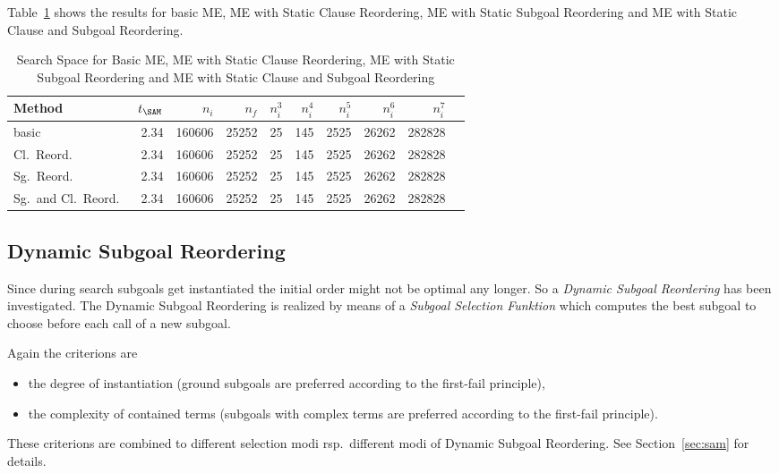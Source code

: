 Table~\ref{tab:tut2:results.static-reord} shows the results for basic
ME, ME with Static Clause Reordering, ME with Static Subgoal
Reordering and ME with Static Clause and Subgoal Reordering.

\begin{table}[htb]
\begin{center}
\begin{tabular}{|l|r|r||r|r||r|r|r|r|r|}
\hline
Method & $t_{\SAM}$ & $n_i$ & $n_f$ & 
	$n_i^3$ & $n_i^4$ & $n_i^5$ & $n_i^6$ & $n_i^7$ \\
\hline\hline
basic & 2.34 & 160606 & 25252 &
	25 & 145 & 2525 & 26262 & 282828 \\
\hline
Cl.\ Reord.\ & 2.34 & 160606 & 25252 &
	25 & 145 & 2525 & 26262 & 282828 \\
\hline
Sg.\ Reord.\ & 2.34 & 160606 & 25252 &
	25 & 145 & 2525 & 26262 & 282828 \\
\hline
Sg.\ and Cl.\ Reord.\ & 2.34 & 160606 & 25252 &
	25 & 145 & 2525 & 26262 & 282828 \\
\hline\hline
\end{tabular}
\end{center}
\caption{Search Space for Basic ME, ME with Static Clause Reordering,
         ME with Static Subgoal Reordering and ME with Static Clause
         and Subgoal Reordering} 
\label{tab:tut2:results.static-reord}
\end{table}


\subsection{Dynamic Subgoal Reordering}

Since during search subgoals get instantiated the initial order
might not be optimal any longer. So a {\em Dynamic Subgoal
Reordering\/} has been investigated. The Dynamic Subgoal
Reordering is realized by means of a {\em Subgoal Selection
Funktion\/} which computes the best subgoal to choose before each call
of a new subgoal.

Again the criterions are 
\begin{itemize}
\item the degree of instantiation (ground subgoals are preferred
	according to the first-fail principle),
\item the complexity of contained terms (subgoals with complex
      terms are preferred according to the first-fail principle).  
\end{itemize}
These criterions are combined to different selection modi rsp.\
different modi of Dynamic Subgoal Reordering. See
Section~\ref{sec:sam} for details. 

